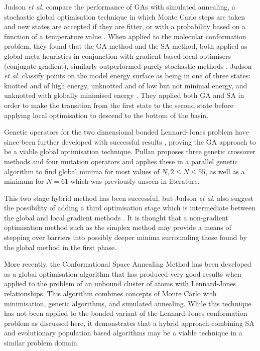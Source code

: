 \documentclass{article}
\begin{document}
Judson \textit{et al.} compare the performance of GAs with simulated annealing,
a stochastic global optimisation technique in which Monte Carlo steps are taken
and new states are accepted if they are fitter, or with a probability based on a
function of a temperature value \cite{doi:10.1002/qua.560440214}. When applied
to the molecular conformation problem, they found that the GA method and the SA
method, both applied as global meta-heuristics in conjunction with
gradient-based local optimisers (conjugate gradient), similarly outperformed
purely stochastic methods \cite{doi:10.1002/qua.560440214}. Judson \textit{et
al.} classify points on the model energy surface as being in one of three
states: knotted and of high energy, unknotted and of low but not minimal energy,
and unknotted with globally minimised energy \cite{doi:10.1002/qua.560440214}.
They applied both GA and SA in order to make the transition from the first state
to the second state before applying local optimisation to descend to the bottom
of the basin.

Genetic operators for the two dimensional bonded Lennard-Jones problem have
since been further developed with successful results \cite{PULLAN1998331},
proving the GA approach to be a viable global optimisation technique. Pullan
\cite{PULLAN1998331} proposes three genetic crossover methods and four mutation
operators and applies these in a parallel genetic algorithm to find global
minima for most values of $N, 2 \leq N \leq 55$, as well as a minimum for $N =
61$ which was previously unseen in literature.

This two stage hybrid method has been successful, but Judson \textit{et al.}
also suggest the possibility of adding a third optimisation stage which is
intermediate between the global and local gradient methods
\cite{doi:10.1002/qua.560440214}. It is thought that a non-gradient optimisation
method such as the simplex method may provide a means of stepping over barriers
into possibly deeper minima surrounding those found by the global method in the
first phase.

More recently, the Conformational Space Annealing Method
\cite{PhysRevLett.91.080201} has been developed as a global optimisation
algorithm that has produced very good results when applied to the problem of an
unbound cluster of atoms with Lennard-Jones relationships. This algorithm
combines concepts of Monte Carlo with minimisation, genetic algorithms, and
simulated annealing. While this technique has not been applied to the bonded
variant of the Lennard-Jones conformation problem as discussed here, it
demonstrates that a hybrid approach combining SA and evolutionary population
based algorithms may be a viable technique in a similar problem domain.
\end{document}

